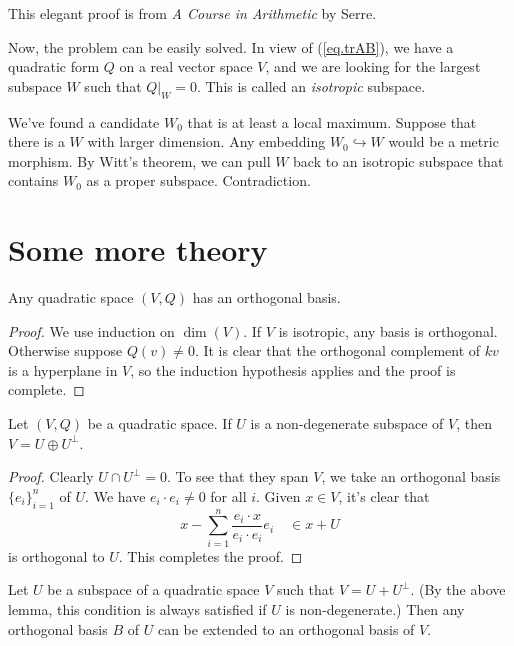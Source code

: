 \documentclass{article}
\begin{document}
This elegant proof is from \emph{A Course in Arithmetic} by Serre.

Now, the problem can be easily solved. In view of (\ref{eq.trAB}), we have a quadratic form $Q$ on a real vector space $V$, and we are looking for the largest subspace $W$ such that $\left.Q\right\vert_W=0$. This is called an \emph{isotropic} subspace.

We've found a candidate $W_0$ that is at least a local maximum. Suppose that there is a $W$ with larger dimension. Any embedding $W_0\hookrightarrow W$ would be a metric morphism. By Witt's theorem, we can pull $W$ back to an isotropic subspace that contains $W_0$ as a proper subspace. Contradiction.

\section{Some more theory}

\begin{proposition}\label{prop.diag}
    Any quadratic space $(V,Q)$ has an orthogonal basis.
\end{proposition}

\begin{proof}
    We use induction on $\dim(V)$. If $V$ is isotropic, any basis is orthogonal. Otherwise suppose $Q(v)\neq 0$. It is clear that the orthogonal complement of $kv$ is a hyperplane in $V$, so the induction hypothesis applies and the proof is complete.
\end{proof}

\begin{lemma}\label{lem.nondegissummand}
    Let $(V,Q)$ be a quadratic space. If $U$ is a non-degenerate subspace of $V$, then $V=U\oplus U^{\bot}$.
\end{lemma}

\begin{proof}
    Clearly $U\cap U^{\bot}=0$. To see that they span $V$, we take an orthogonal basis $\{e_i\}_{i=1}^n$ of $U$. We have $e_i\cdot e_i\neq 0$ for all $i$. Given $x\in V$, it's clear that
    \begin{equation*}
        x-\sum_{i=1}^n \frac{e_i\cdot x}{e_i\cdot e_i}e_i \quad\in x+U
    \end{equation*}
    is orthogonal to $U$. This completes the proof.
\end{proof}

\begin{proposition}\label{prop.extend}
    Let $U$ be a subspace of a quadratic space $V$ such that $V=U+U^\bot$. (By the above lemma, this condition is always satisfied if $U$ is non-degenerate.) Then any orthogonal basis $B$ of $U$ can be extended to an orthogonal basis of $V$.
\end{proposition}
\end{document}
